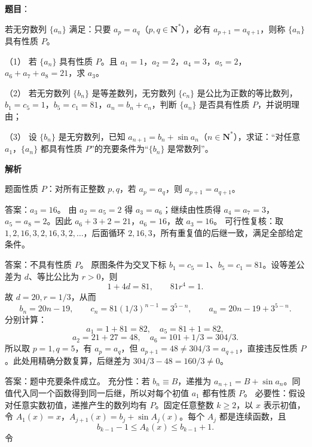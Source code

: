 \begin{answer}

\textbf{题目}：

若无穷数列 \(\{a_n\}\) 满足：只要 \(a_p=a_q\)（\(p,q\in\mathbf{N}^*\)），必有 \(a_{p+1}=a_{q+1}\)，则称 \(\{a_n\}\) 具有性质 \(P\)。

（1） 若 \(\{a_n\}\) 具有性质 \(P\)。且 \(a_1=1\)，\(a_2=2\)，\(a_4=3\)，\(a_5=2\)，\(a_6+a_7+a_8=21\)，求 \(a_3\)。

（2） 若无穷数列 \(\{b_n\}\) 是等差数列，无穷数列 \(\{c_n\}\) 是公比为正数的等比数列，\(b_1=c_5=1\)，\(b_5=c_1=81\)，\(a_n=b_n+c_n\)，判断 \(\{a_n\}\) 是否具有性质 \(P\)，并说明理由；

（3） 设 \(\{b_n\}\) 是无穷数列，已知 \(a_{n+1}=b_n+\sin a_n\)（\(n\in\mathbf{N}^*\)），求证：“对任意 \(a_1\)，\(\{a_n\}\) 都具有性质 \(P\)”的充要条件为“\(\{b_n\}\) 是常数列”。

\textbf{解析}

题面性质 \(P\)：对所有正整数 \(p,q\)，若 \(a_p=a_q\)，则 \(a_{p+1}=a_{q+1}\)。


答案：\(a_3=16\)。
由 \(a_2=a_5=2\) 得 \(a_3=a_6\)；继续由性质得 \(a_4=a_7=3\)，\(a_5=a_8=2\)。因此 \(a_6+3+2=21\)，\(a_6=16\)，故 \(a_3=16\)。
可行性复核：取 \(1,2,16,3,2,16,3,2,\ldots\)，后面循环 \(2,16,3\)，所有重复值的后继一致，满足全部给定条件。


答案：不具有性质 \(P\)。
原图条件为交叉下标 \(b_1=c_5=1\)、\(b_5=c_1=81\)。设等差公差为 \(d\)、等比公比为 \(r>0\)，则
\nopagebreak[4]
\[
1+4d=81,\qquad 81r^4=1.
\]
故 \(d=20,r=1/3\)，从而
\nopagebreak[4]
\[
b_n=20n-19,\qquad c_n=81(1/3)^{n-1}=3^{5-n},\qquad a_n=20n-19+3^{5-n}.
\]
分别计算：
\nopagebreak[4]
\[
a_1=1+81=82,\quad a_5=81+1=82,
\]
\nopagebreak[4]
\[
a_2=21+27=48,\quad a_6=101+1/3=304/3.
\]
所以取 \(p=1,q=5\)，有 \(a_p=a_q\)，但 \(a_{p+1}=48\ne304/3=a_{q+1}\)，直接违反性质 \(P\)。此处用精确分数复算，后继差为 \(304/3-48=160/3\ne0\)。


答案：题中充要条件成立。
充分性：若 \(b_n\equiv B\)，递推为 \(a_{n+1}=B+\sin a_n\)。同值代入同一个函数得到同一后继，所以对每个初值 \(a_1\) 都有性质 \(P\)。
必要性：假设对任意实数初值，递推产生的数列均有 \(P\)。固定任意整数 \(k\ge2\)，以 \(x\) 表示初值，令 \(A_1(x)=x\)，\(A_{j+1}(x)=b_j+\sin A_j(x)\)。每个 \(A_j\) 都是连续函数，且
\nopagebreak[4]
\[
b_{k-1}-1\le A_k(x)\le b_{k-1}+1.
\]
令


\end{answer}
